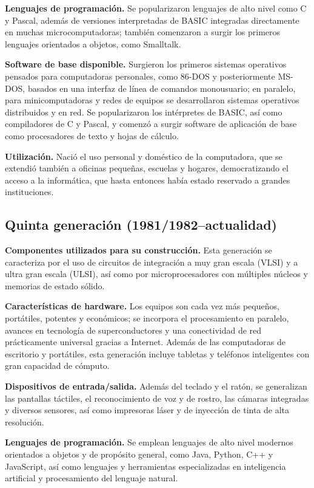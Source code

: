 \documentclass[12pt,letterpaper]{article}
\begin{document}
\textbf{Lenguajes de programación.} Se popularizaron lenguajes de alto nivel como C y Pascal, además de versiones interpretadas de BASIC integradas directamente en muchas microcomputadoras; también comenzaron a surgir los primeros lenguajes orientados a objetos, como Smalltalk.

\textbf{Software de base disponible.} Surgieron los primeros sistemas operativos pensados para computadoras personales, como 86-DOS y posteriormente MS-DOS, basados en una interfaz de línea de comandos monousuario; en paralelo, para minicomputadoras y redes de equipos se desarrollaron sistemas operativos distribuidos y en red. Se popularizaron los intérpretes de BASIC, así como compiladores de C y Pascal, y comenzó a surgir software de aplicación de base como procesadores de texto y hojas de cálculo.

\textbf{Utilización.} Nació el uso personal y doméstico de la computadora, que se extendió también a oficinas pequeñas, escuelas y hogares, democratizando el acceso a la informática, que hasta entonces había estado reservado a grandes instituciones.

\subsection{Quinta generación (1981/1982--actualidad)}

\textbf{Componentes utilizados para su construcción.} Esta generación se caracteriza por el uso de circuitos de integración a muy gran escala (VLSI) y a ultra gran escala (ULSI), así como por microprocesadores con múltiples núcleos y memorias de estado sólido.

\textbf{Características de hardware.} Los equipos son cada vez más pequeños, portátiles, potentes y económicos; se incorpora el procesamiento en paralelo, avances en tecnología de superconductores y una conectividad de red prácticamente universal gracias a Internet. Además de las computadoras de escritorio y portátiles, esta generación incluye tabletas y teléfonos inteligentes con gran capacidad de cómputo.

\textbf{Dispositivos de entrada/salida.} Además del teclado y el ratón, se generalizan las pantallas táctiles, el reconocimiento de voz y de rostro, las cámaras integradas y diversos sensores, así como impresoras láser y de inyección de tinta de alta resolución.

\textbf{Lenguajes de programación.} Se emplean lenguajes de alto nivel modernos orientados a objetos y de propósito general, como Java, Python, C++ y JavaScript, así como lenguajes y herramientas especializadas en inteligencia artificial y procesamiento del lenguaje natural.
\end{document}
